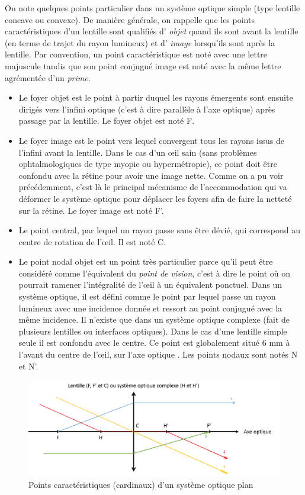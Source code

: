 	\par On note quelques points particulier dans un système optique simple (type lentille concave ou convexe). De manière générale, on rappelle que les points caractéristiques d'un lentille sont qualifiés d' \textit{objet} quand ils sont avant la lentille (en terme de trajet du rayon lumineux) et d' \textit{image} lorsqu'ils sont après la lentille. Par convention, un point caractéristique est noté avec une lettre majuscule tandis que son point conjugué image est noté avec la même lettre agrémentée d'un \textit{prime}.
	\begin{itemize}
		\item Le foyer objet est le point à partir duquel les rayons émergents sont ensuite dirigés vers l'infini optique (c'est à dire parallèle à l'axe optique) après passage par la lentille. Le foyer objet est noté F.
		\item Le foyer image est le point vers lequel convergent tous les rayons issus de l'infini avant la lentille. Dans le cas d'un œil sain (sans problèmes ophtalmologiques de type myopie ou hypermétropie), ce point doit être confondu avec la rétine pour avoir une image nette. Comme on a pu voir précédemment, c'est là le principal mécanisme de l'accommodation qui va déformer le système optique pour déplacer les foyers afin de faire la netteté sur la rétine. Le foyer image est noté F'.
		\item Le point central, par lequel un rayon passe sans être dévié, qui correspond au centre de rotation de l'œil. Il est noté C.
		\item Le point nodal objet est un point très particulier parce qu'il peut être considéré comme l'équivalent du \textit{point de vision}, c'est à dire le point où on pourrait ramener l'intégralité de l'œil à un équivalent ponctuel. Dans un système optique, il est défini comme le point par lequel passe un rayon lumineux avec une incidence donnée et ressort au point conjugué avec la même incidence. Il n'existe que dans un système optique complexe (fait de plusieurs lentilles ou interfaces optiques). Dans le cas d'une lentille simple seule il est confondu avec le centre. Ce point est globalement situé 6 mm à l'avant du centre de l'œil, sur l'axe optique \citep{gross_human_2008,ogle_optics:_1968}. Les points nodaux sont notés N et N'.
	\end{itemize}
	
	\begin{figure}
		\centering
		\includegraphics[scale=.5]{Figures/PointsSystemeOptique}
		\caption{Points caractéristiques (cardinaux) d'un système optique plan}
		\label{fig:points_cardinaux_systeme_optique}
	\end{figure}
	
